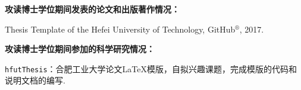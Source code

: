 \begin{publications}{99}
\item[] {\bf{攻读博士学位期间发表的论文和出版著作情况：}}

\item Thesis Template of the Hefei University of Technology, GitHub$^{\circledR}$, 2017.

\vspace{1.0cm}
\item[] {{\songti{}\bf{攻读博士学位期间参加的科学研究情况：}}}
\setcounter{enumiv}{0}

\item \texttt{hfutThesis}：合肥工业大学论文\LaTeX{}模版，自拟兴趣课题，完成模版的代码和说明文档的编写.


\end{publications}
